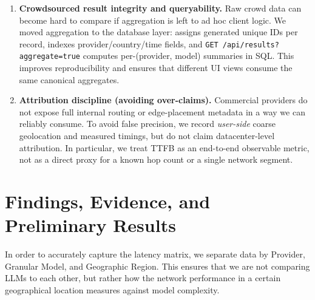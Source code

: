 \documentclass[11pt, a4paper]{article}
\begin{document}
\begin{enumerate}
  \item \textbf{Crowdsourced result integrity and queryability.} Raw crowd data can become hard to compare if aggregation is left to ad hoc client logic. We moved aggregation to the database layer:  assigns generated unique IDs per record, indexes provider/country/time fields, and \texttt{GET /api/results?aggregate=true} computes per-(provider, model) summaries in SQL. This improves reproducibility and ensures that different UI views consume the same canonical aggregates.

  \item \textbf{Attribution discipline (avoiding over-claims).} Commercial providers do not expose full internal routing or edge-placement metadata in a way we can reliably consume. To avoid false precision, we record \emph{user-side} coarse geolocation and measured timings, but do not claim datacenter-level attribution. In particular, we treat TTFB as an end-to-end observable metric, not as a direct proxy for a known hop count or a single network segment.
\end{enumerate}



\section{Findings, Evidence, and Preliminary Results}

In order to accurately capture the latency matrix, we separate data by Provider, Granular Model, and Geographic Region. This ensures that we are not comparing LLMs to each other, but rather how the network performance in a certain geographical location measures against model complexity.
\end{document}
